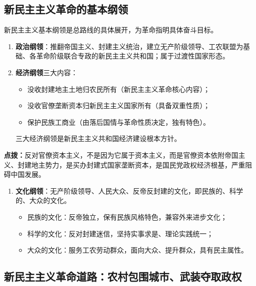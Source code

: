 \subsection{新民主主义革命的基本纲领}
新民主主义基本纲领是总路线的具体展开，为革命指明具体奋斗目标。
\begin{enumerate}
    \item \textbf{政治纲领}：推翻帝国主义、封建主义统治，建立无产阶级领导、工农联盟为基础、各革命阶级联合专政的新民主主义共和国；属于过渡性国家形态。
    \item \textbf{经济纲领}三大内容：
    \begin{itemize}
        \item 没收封建地主土地归农民所有（新民主主义革命核心内容）；
        \item 没收官僚垄断资本归新民主主义国家所有（具备双重性质）；
        \item 保护民族工商业（由落后国情与革命性质决定，独有特色）。
    \end{itemize}
    三大经济纲领是新民主主义共和国经济建设根本方针。
\end{enumerate}
\vspace{0.4em}
\noindent\sloppy\colorbox{orange!10}{
    \begin{minipage}{0.92\textwidth}
        \textbf{点拨：}反对官僚资本主义，不是因为它属于资本主义，而是官僚资本依附帝国主义、封建地主势力，是买办封建式国家垄断资本，是国民党政权经济根基，严重阻碍中国发展。
    \end{minipage}
}
\vspace{0.4em}

\begin{enumerate}[resume]
    \item \textbf{文化纲领}：无产阶级领导、人民大众、反帝反封建的文化，即民族的、科学的、大众的文化。
    \begin{itemize}
        \item 民族的文化：反帝独立，保有民族风格特色，兼容外来进步文化；
        \item 科学的文化：反对封建迷信，坚持实事求是、理论实践统一；
        \item 大众的文化：服务工农劳动群众，面向大众、提升群众，具有民主属性。
    \end{itemize}
\end{enumerate}

\subsection{新民主主义革命道路：农村包围城市、武装夺取政权}
